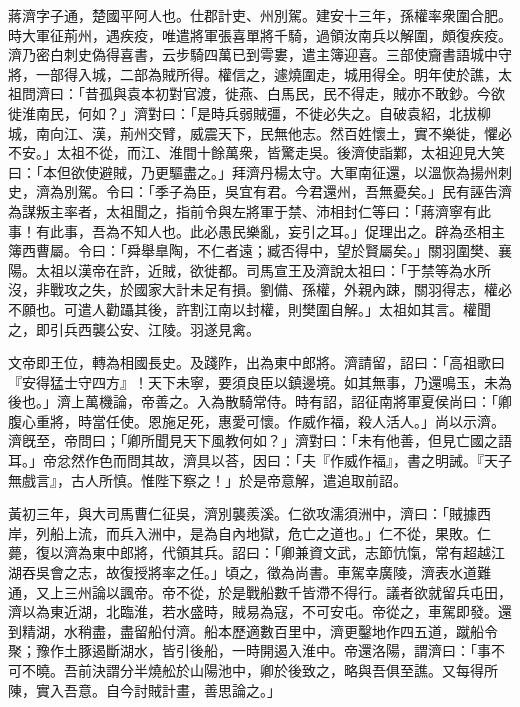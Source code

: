 
\begin{pinyinscope}
蔣濟字子通，楚國平阿人也。仕郡計吏、州別駕。建安十三年，孫權率衆圍合肥。時大軍征荊州，遇疾疫，唯遣將軍張喜單將千騎，過領汝南兵以解圍，頗復疾疫。濟乃密白刺史偽得喜書，云步騎四萬已到雩婁，遣主簿迎喜。三部使齎書語城中守將，一部得入城，二部為賊所得。權信之，遽燒圍走，城用得全。明年使於譙，太祖問濟曰：「昔孤與袁本初對官渡，徙燕、白馬民，民不得走，賊亦不敢鈔。今欲徙淮南民，何如？」濟對曰：「是時兵弱賊彊，不徙必失之。自破袁紹，北拔柳城，南向江、漢，荊州交臂，威震天下，民無他志。然百姓懷土，實不樂徙，懼必不安。」太祖不從，而江、淮間十餘萬衆，皆驚走吳。後濟使詣鄴，太祖迎見大笑曰：「本但欲使避賊，乃更驅盡之。」拜濟丹楊太守。大軍南征還，以溫恢為揚州刺史，濟為別駕。令曰：「季子為臣，吳宜有君。今君還州，吾無憂矣。」民有誣告濟為謀叛主率者，太祖聞之，指前令與左將軍于禁、沛相封仁等曰：「蔣濟寧有此事！有此事，吾為不知人也。此必愚民樂亂，妄引之耳。」促理出之。辟為丞相主簿西曹屬。令曰：「舜舉臯陶，不仁者遠；臧否得中，望於賢屬矣。」關羽圍樊、襄陽。太祖以漢帝在許，近賊，欲徙都。司馬宣王及濟說太祖曰：「于禁等為水所沒，非戰攻之失，於國家大計未足有損。劉備、孫權，外親內踈，關羽得志，權必不願也。可遣人勸躡其後，許割江南以封權，則樊圍自解。」太祖如其言。權聞之，即引兵西襲公安、江陵。羽遂見禽。

文帝即王位，轉為相國長史。及踐阼，出為東中郎將。濟請留，詔曰：「高祖歌曰『安得猛士守四方』！天下未寧，要須良臣以鎮邊境。如其無事，乃還鳴玉，未為後也。」濟上萬機論，帝善之。入為散騎常侍。時有詔，詔征南將軍夏侯尚曰：「卿腹心重將，時當任使。恩施足死，惠愛可懷。作威作福，殺人活人。」尚以示濟。濟旣至，帝問曰；「卿所聞見天下風教何如？」濟對曰：「未有他善，但見亡國之語耳。」帝忿然作色而問其故，濟具以荅，因曰：「夫『作威作福』，書之明誡。『天子無戲言』，古人所慎。惟陛下察之！」於是帝意解，遣追取前詔。

黃初三年，與大司馬曹仁征吳，濟別襲羨溪。仁欲攻濡須洲中，濟曰：「賊據西岸，列船上流，而兵入洲中，是為自內地獄，危亡之道也。」仁不從，果敗。仁薨，復以濟為東中郎將，代領其兵。詔曰：「卿兼資文武，志節忼愾，常有超越江湖吞吳會之志，故復授將率之任。」頃之，徵為尚書。車駕幸廣陵，濟表水道難通，又上三州論以諷帝。帝不從，於是戰船數千皆滯不得行。議者欲就留兵屯田，濟以為東近湖，北臨淮，若水盛時，賊易為寇，不可安屯。帝從之，車駕即發。還到精湖，水稍盡，盡留船付濟。船本歷適數百里中，濟更鑿地作四五道，蹴船令聚；豫作土豚遏斷湖水，皆引後船，一時開遏入淮中。帝還洛陽，謂濟曰：「事不可不曉。吾前決謂分半燒舩於山陽池中，卿於後致之，略與吾俱至譙。又每得所陳，實入吾意。自今討賊計畫，善思論之。」


\end{pinyinscope}
